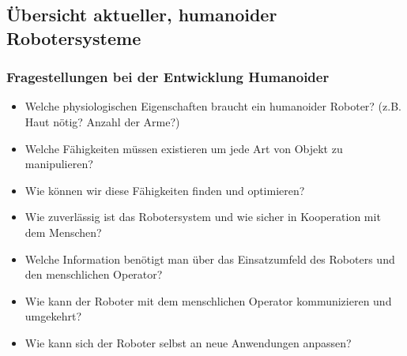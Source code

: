 \subsection{Übersicht aktueller, humanoider Robotersysteme}

\subsubsection{Fragestellungen bei der Entwicklung Humanoider}
\begin{itemize}
	\item Welche physiologischen Eigenschaften braucht ein humanoider Roboter? (z.B. Haut nötig? Anzahl der Arme?)
	\item Welche Fähigkeiten müssen existieren um jede Art von Objekt zu manipulieren?
	\item Wie können wir diese Fähigkeiten finden und optimieren?
	\item Wie zuverlässig ist das Robotersystem und wie sicher in Kooperation mit dem Menschen?
	\item Welche Information benötigt man über das Einsatzumfeld des Roboters und den menschlichen Operator?
	\item Wie kann der Roboter mit dem menschlichen Operator kommunizieren und umgekehrt?
	\item Wie kann sich der Roboter selbst an neue Anwendungen anpassen?
\end{itemize}

